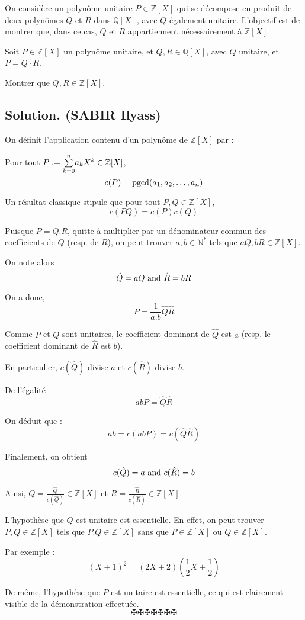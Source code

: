 On consid{\`e}re un polyn{\^o}me unitaire $P \in \mathbb{Z} [X]$ qui se
d{\'e}compose en produit de deux polyn{\^o}mes $Q$ et $R$ dans $\mathbb{Q}
[X]$, avec $Q$ {\'e}galement unitaire. L'objectif est de montrer que, dans ce
cas, $Q$ et $R$ appartiennent n{\'e}cessairement {\`a} $\mathbb{Z} [X]$.

\begin{exercise}[]
Soit $P \in \mathbb{Z}[X]$ un polyn{\^o}me unitaire, et $Q, R \in
\mathbb{Q}[X]$, avec $Q$ unitaire, et $P = Q \cdot R$.

Montrer que $Q, R \in \mathbb{Z}[X]$.
\end{exercise}

\subsection*{Solution. (SABIR Ilyass)}

On d{\'e}finit l'application contenu d'un polyn{\^o}me de $\mathbb{Z}[X]$ par
:

Pour tout $P := \underset{k = 0}{\overset{n}{\sum}} a_k X^k \in
\mathbb{Z} [X]$,
\[ c (P) = \operatorname{pgcd} (a_1, a_2, \ldots, a_n) \]


Un r{\'e}sultat classique stipule que pour tout $P, Q \in \mathbb{Z}[X]$,
\[ c (PQ) = c (P) c (Q) \]


Puisque $P = Q.R$, quitte {\`a} multiplier par un d{\'e}nominateur commun des
coefficients de $Q$ (resp. de $R$), on peut trouver $a, b \in
\mathbb{N}^{\ast}$ tels que $a Q, b R \in \mathbb{Z} [X]$.

On note alors
\[ \hat{Q} = aQ \text{ and } \hat{R} = bR \]


On a donc,
\[ P = \frac{1}{a.b}  \hat{Q}  \hat{R} \]


Comme $P$ et $Q$ sont unitaires, le coefficient dominant de $\hat{Q}$ est $a$
(resp. le coefficient dominant de $\hat{R}$ est $b$).

En particulier, $c (\hat{Q})$ divise $a$ et $c (\hat{R})$ divise $b$.

De l'{\'e}galit{\'e}
\[ abP = \hat{Q}  \hat{R} \]


On d{\'e}duit que :
\[ ab = c (abP) = c (\hat{Q}  \hat{R}) \]


Finalement, on obtient
\[ c (\hat{Q}) = a \text{ and } c (\hat{R}) = b \]


Ainsi, $Q = \frac{\hat{Q}}{c (\hat{Q})} \in \mathbb{Z}[X]$ et $R =
\frac{\hat{R}}{c (\hat{R})} \in \mathbb{Z}[X]$.


L'hypoth{\`e}se que $Q$ est unitaire est essentielle. En effet, on peut
trouver $P, Q \in \mathbb{Z}[X]$ tels que $P.Q \in \mathbb{Z}[X]$ sans que $P
\in \mathbb{Z}[X]$ ou $Q \in \mathbb{Z}[X]$.

Par exemple :
\[ (X + 1)^2 = (2 X + 2) \left( \frac{1}{2} X + \frac{1}{2} \right) \]


De m{\^e}me, l'hypoth{\`e}se que $P$ est unitaire est essentielle, ce qui est
clairement visible de la d{\'e}monstration effectu{\'e}e.
\[ \maltese \maltese \maltese \maltese \maltese \maltese \maltese \]
